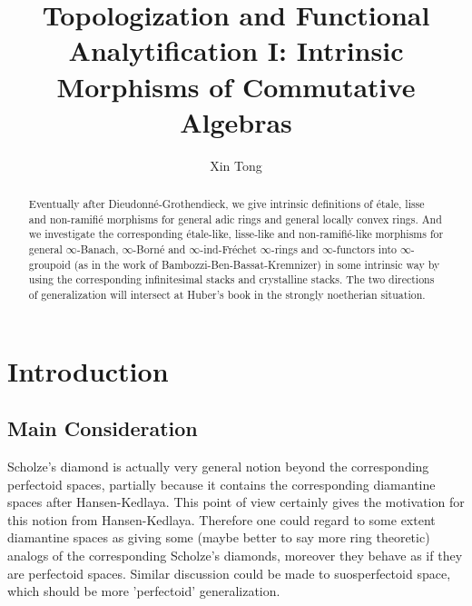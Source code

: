 \documentclass[12pt]{amsart}
\theoremstyle{definition}
\numberwithin{equation}{section}
\begin{document}
\normalfont



\title{Topologization and Functional Analytification I: Intrinsic Morphisms of Commutative Algebras}
\author{Xin Tong}



\maketitle


\begin{abstract}
\rm Eventually after Dieudonn\'e-Grothendieck, we give intrinsic definitions of \'etale, lisse and non-ramifi\'e morphisms for general adic rings and general locally convex rings. And we investigate the corresponding \'etale-like, lisse-like and non-ramifi\'e-like morphisms for general $\infty$-Banach, $\infty$-Born\'e and $\infty$-ind-Fr\'echet $\infty$-rings  and $\infty$-functors into $\infty$-groupoid (as in the work of Bambozzi-Ben-Bassat-Kremnizer) in some intrinsic way by using the corresponding infinitesimal stacks and crystalline stacks. The two directions of generalization will intersect at Huber's book in the strongly noetherian situation. 
\end{abstract}







\tableofcontents





\section{Introduction}

\subsection{Main Consideration}

\noindent Scholze's diamond is actually very general notion beyond the corresponding perfectoid spaces, partially because it contains the corresponding diamantine spaces after Hansen-Kedlaya. This point of view certainly gives the motivation for this notion from Hansen-Kedlaya. Therefore one could regard to some extent diamantine spaces as giving some (maybe better to say more ring theoretic) analogs of the corresponding Scholze's diamonds, moreover they behave as if they are perfectoid spaces. Similar discussion could be made to suosperfectoid space, which should be more 'perfectoid' generalization.\\
\end{document}
